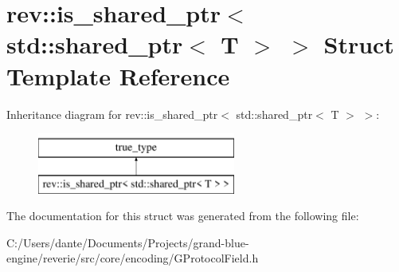 \hypertarget{structrev_1_1is__shared__ptr_3_01std_1_1shared__ptr_3_01_t_01_4_01_4}{}\section{rev\+::is\+\_\+shared\+\_\+ptr$<$ std\+::shared\+\_\+ptr$<$ T $>$ $>$ Struct Template Reference}
\label{structrev_1_1is__shared__ptr_3_01std_1_1shared__ptr_3_01_t_01_4_01_4}
Inheritance diagram for rev\+::is\+\_\+shared\+\_\+ptr$<$ std\+::shared\+\_\+ptr$<$ T $>$ $>$\+:\begin{figure}[H]
\begin{center}
\leavevmode
\includegraphics[height=2.000000cm]{structrev_1_1is__shared__ptr_3_01std_1_1shared__ptr_3_01_t_01_4_01_4}
\end{center}
\end{figure}


The documentation for this struct was generated from the following file\+:\begin{DoxyCompactItemize}
\item 
C\+:/\+Users/dante/\+Documents/\+Projects/grand-\/blue-\/engine/reverie/src/core/encoding/G\+Protocol\+Field.\+h\end{DoxyCompactItemize}
